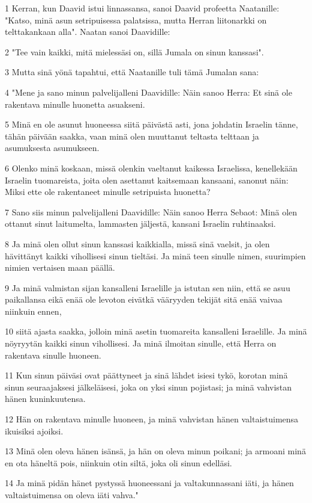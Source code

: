 \par 1 Kerran, kun Daavid istui linnassansa, sanoi Daavid profeetta Naatanille: "Katso, minä asun setripuisessa palatsissa, mutta Herran liitonarkki on telttakankaan alla". Naatan sanoi Daavidille:
\par 2 "Tee vain kaikki, mitä mielessäsi on, sillä Jumala on sinun kanssasi".
\par 3 Mutta sinä yönä tapahtui, että Naatanille tuli tämä Jumalan sana:
\par 4 "Mene ja sano minun palvelijalleni Daavidille: Näin sanoo Herra: Et sinä ole rakentava minulle huonetta asuakseni.
\par 5 Minä en ole asunut huoneessa siitä päivästä asti, jona johdatin Israelin tänne, tähän päivään saakka, vaan minä olen muuttanut teltasta telttaan ja asumuksesta asumukseen.
\par 6 Olenko minä koskaan, missä olenkin vaeltanut kaikessa Israelissa, kenellekään Israelin tuomareista, joita olen asettanut kaitsemaan kansaani, sanonut näin: Miksi ette ole rakentaneet minulle setripuista huonetta?
\par 7 Sano siis minun palvelijalleni Daavidille: Näin sanoo Herra Sebaot: Minä olen ottanut sinut laitumelta, lammasten jäljestä, kansani Israelin ruhtinaaksi.
\par 8 Ja minä olen ollut sinun kanssasi kaikkialla, missä sinä vaelsit, ja olen hävittänyt kaikki vihollisesi sinun tieltäsi. Ja minä teen sinulle nimen, suurimpien nimien vertaisen maan päällä.
\par 9 Ja minä valmistan sijan kansalleni Israelille ja istutan sen niin, että se asuu paikallansa eikä enää ole levoton eivätkä vääryyden tekijät sitä enää vaivaa niinkuin ennen,
\par 10 siitä ajasta saakka, jolloin minä asetin tuomareita kansalleni Israelille. Ja minä nöyryytän kaikki sinun vihollisesi. Ja minä ilmoitan sinulle, että Herra on rakentava sinulle huoneen.
\par 11 Kun sinun päiväsi ovat päättyneet ja sinä lähdet isiesi tykö, korotan minä sinun seuraajaksesi jälkeläisesi, joka on yksi sinun pojistasi; ja minä vahvistan hänen kuninkuutensa.
\par 12 Hän on rakentava minulle huoneen, ja minä vahvistan hänen valtaistuimensa ikuisiksi ajoiksi.
\par 13 Minä olen oleva hänen isänsä, ja hän on oleva minun poikani; ja armoani minä en ota häneltä pois, niinkuin otin siltä, joka oli sinun edelläsi.
\par 14 Ja minä pidän hänet pystyssä huoneessani ja valtakunnassani iäti, ja hänen valtaistuimensa on oleva iäti vahva."
